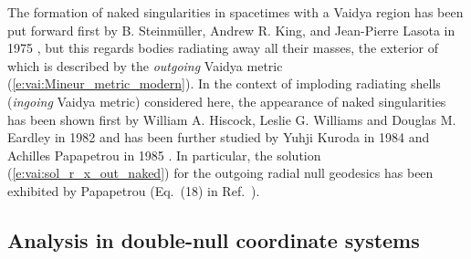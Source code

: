 \begin{hist}
The formation of naked singularities in spacetimes with a Vaidya region
has been put forward first by B. Steinmüller, Andrew R. King, and Jean-Pierre Lasota
in 1975 \cite{SteinmKL75}, but this regards bodies radiating away all their masses, the exterior of which
is described by the \emph{outgoing} Vaidya metric (\ref{e:vai:Mineur_metric_modern}).
In the context of imploding
radiating shells (\emph{ingoing} Vaidya metric) considered here, the appearance of naked singularities
has been shown first by William A. Hiscock, Leslie G. Williams and Douglas M. Eardley in 1982 \cite{HiscoWE82} and has been further studied by
Yuhji Kuroda in 1984 \cite{Kurod84} and Achilles Papapetrou in 1985 \cite{Papap85}. In particular, the solution (\ref{e:vai:sol_r_x_out_naked}) for the
outgoing radial null geodesics has been exhibited by Papapetrou (Eq.~(18) in Ref.~\cite{Papap85}).
\end{hist}

\subsection{Analysis in double-null coordinate systems} \label{s:vai:analysis_double_null}

